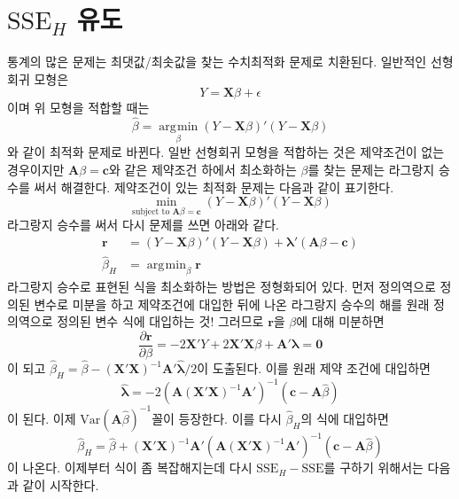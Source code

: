 \documentclass[answers]{exam}
\DeclareMathOperator*{\argmin}{\arg\!\min}
\newcommand{\bs}{\boldsymbol}
\begin{document}
   \section{$\mathrm{SSE}_{H}$ 유도}
   통계의 많은 문제는 최댓값/최솟값을 찾는 수치최적화 문제로 치환된다. 일반적인 선형회귀 모형은
   $$
    Y=\mathbf{X}\beta+\epsilon
   $$
   이며 위 모형을 적합할 때는
   $$
    \widehat{\beta}= \argmin\limits_{\beta}\left(Y-\mathbf{X}\beta\right)'\left(Y-\mathbf{X}\beta\right)
   $$
   와 같이 최적화 문제로 바뀐다. 일반 선형회귀 모형을 적합하는 것은 제약조건이 없는 경우이지만 $\mathbf{A}\beta=\mathbf{c}$와 같은 제약조건 하에서 최소화하는 $\beta$를 찾는 문제는 라그랑지 승수를 써서 해결한다. 제약조건이 있는 최적화 문제는 다음과 같이 표기한다.
   $$
    \min_{\text{subject to }\mathbf{A}\beta=\mathbf{c}}\left(Y-\mathbf{X}\beta\right)'\left(Y-\mathbf{X}\beta\right)
   $$
   라그랑지 승수를 써서 다시 문제를 쓰면 아래와 같다.
   \begin{align}
    \mathbf{r}&=\left(Y-\mathbf{X}\beta\right)'\left(Y-\mathbf{X}\beta\right)+\bs{\lambda}'\left(\mathbf{A}\beta-\mathbf{c}\right) \\
    \widehat{\beta}_{H}&= \argmin_{\beta} \mathbf{r}
   \end{align}
   라그랑지 승수로 표현된 식을 최소화하는 방법은 정형화되어 있다. 먼저 정의역으로 정의된 변수로 미분을 하고 제약조건에 대입한 뒤에 나온 라그랑지 승수의 해를 원래 정의역으로 정의된 변수 식에 대입하는 것! 그러므로 $\mathbf{r}$을 $\beta$에 대해 미분하면
   $$
    \dfrac{\partial \mathbf{r}}{\partial \beta} = -2\mathbf{X}'Y + 2\mathbf{X}'\mathbf{X}\beta+\mathbf{A}'\bs{\lambda}=\mathbf{0}    
   $$
   이 되고 $\widehat{\beta}_{H}=\widehat{\beta}-\left(\mathbf{X}'\mathbf{X}\right)^{-1}\mathbf{A}'\widehat{\bs{\lambda}}/2$이 도출된다. 이를 원래 제약 조건에 대입하면
   $$
    \widehat{\bs{\lambda}} = -2\left(\mathbf{A}\left(\mathbf{X}'\mathbf{X}\right)^{-1}\mathbf{A}'\right)^{-1}\left(\mathbf{c}-\mathbf{A}\widehat{\beta}\right)
   $$
   이 된다. 이제 $\mathrm{Var}\left(\mathbf{A}\widehat{\beta}\right)^{-1}$꼴이 등장한다. 이를 다시 $\widehat{\beta}_{H}$의 식에 대입하면
   \begin{equation}
    \widehat{\beta}_{H}= \widehat{\beta}+\left(\mathbf{X}'\mathbf{X}\right)^{-1}\mathbf{A}'\left(\mathbf{A}\left(\mathbf{X}'\mathbf{X}\right)^{-1}\mathbf{A}'\right)^{-1}\left(\mathbf{c}-\mathbf{A}\widehat{\beta}\right)
   \end{equation}
   이 나온다. 이제부터 식이 좀 복잡해지는데 다시 $\mathrm{SSE}_{H}-\mathrm{SSE}$를 구하기 위해서는 다음과 같이 시작한다.
\end{document}
